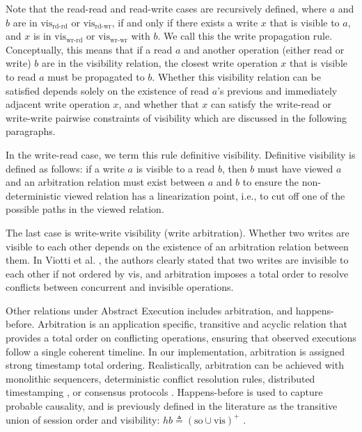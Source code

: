 Note that the read-read and read-write cases are recursively
defined, where $a$ and $b$ are in $\text{vis}_\text{rd-rd}$ or
$\text{vis}_\text{rd-wr}$, if and only if there exists a
write $x$ that is
visible to $a$, and $x$ is in $\text{vis}_\text{wr-rd}$ or
$\text{vis}_\text{wr-wr}$ with $b$. We call this the
write propagation rule. Conceptually, this means that if a read $a$
and another operation (either read or write) $b$ are in the visibility relation,
the closest write operation $x$ that is visible to read $a$ must
be propagated
to $b$. Whether this visibility relation can be satisfied
depends solely on the existence of read $a$'s previous and
immediately adjacent write operation $x$, and whether
that $x$ can satisfy the write-read or write-write pairwise
constraints of visibility which are
discussed in the following paragraphs.

In the write-read case, we term this rule definitive
visibility. Definitive
visibility is defined as follows: if a write $a$ is
visible to a read $b$, then $b$
must have viewed $a$ and an arbitration relation must exist between $a$ and $b$
to ensure the non-deterministic viewed relation has a
linearization point,
i.e., to cut off one of the possible paths in the viewed relation.

The last case is write-write visibility (write arbitration).
Whether two writes are visible to each other depends on the existence of an
arbitration relation between them. In Viotti et al.
\cite{viotti2016consistency}, the authors clearly stated that two writes
are invisible to each other if not
ordered by vis,
and arbitration imposes a total order to resolve conflicts between concurrent
and invisible operations.

Other relations under Abstract Execution includes arbitration, and
happens-before.
Arbitration is an application specific, transitive and acyclic
relation that provides a total order on conflicting operations,
ensuring that observed executions follow a single coherent timeline. In
our implementation, arbitration is assigned strong timestamp total ordering.
Realistically, arbitration can be achieved with monolithic
sequencers, deterministic
conflict resolution rules, distributed timestamping \cite{lamport1978time},
or consensus protocols
\cite{birman1991lightweight,hadzilacos1994modular,lamport2001paxos}.
Happens-before is used to capture probable causality,
and is previously defined in the literature as the transitive union
of session order and visibility:
$hb \triangleq (\text{so} \cup {\text{vis}})^{+}$
\cite{burckhardt2014principles,viotti2016consistency}.

